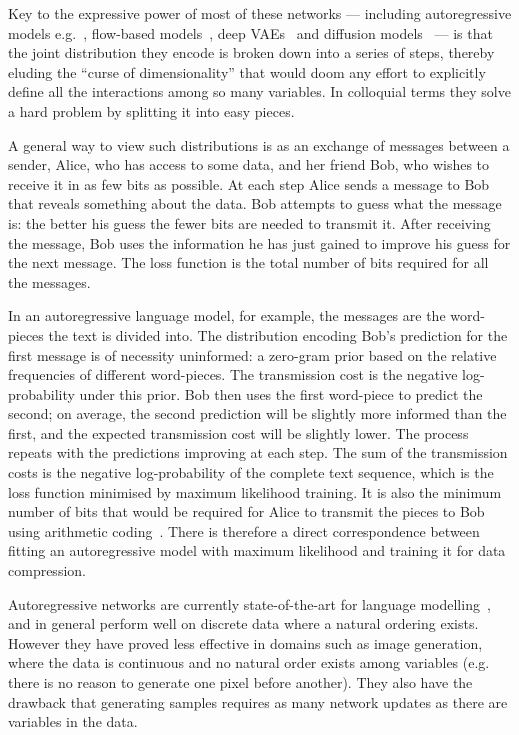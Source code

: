 \documentclass[11pt,table]{article}
\newcommand{\0}[1]{\constvec{0}{#1}}
\newcommand{\1}[1]{\constvec{1}{#1}}
\begin{document}
Key to the expressive power of most of these networks --- including autoregressive models e.g.~\citep{sutskever2011generating,graves2013generating}, flow-based models~\citep{rezende2015variational}, deep VAEs~\citep{vahdat2020nvae} and diffusion models~\citep{sohl2015deep} --- is that the joint distribution they encode is broken down into a series of steps, thereby eluding the ``curse of dimensionality'' that would doom any effort to explicitly define all the interactions among so many variables.
In colloquial terms they solve a hard problem by splitting it into easy pieces.

A general way to view such distributions is as an exchange of messages between a sender, Alice, who has access to some data, and her friend Bob, who wishes to receive it in as few bits as possible. 
At each step Alice sends a message to Bob that reveals something about the data.
Bob attempts to guess what the message is: the better his guess the fewer bits are needed to transmit it.
After receiving the message, Bob uses the information he has just gained to improve his guess for the next message.
The loss function is the total number of bits required for all the messages.

In an autoregressive language model, for example, the messages are the word-pieces the text is divided into. 
The distribution encoding Bob’s prediction for the first message is of necessity uninformed: a zero-gram prior based on the relative frequencies of different word-pieces. 
The transmission cost is the negative log-probability under this prior. 
Bob then uses the first word-piece to predict the second; on average, the second prediction will be slightly more informed than the first, and the expected transmission cost will be slightly lower. 
The process repeats with the predictions improving at each step. 
The sum of the transmission costs is the negative log-probability of the complete text sequence, which is the loss function minimised by maximum likelihood training.  
It is also the minimum number of bits that would be required for Alice to transmit the pieces to Bob using arithmetic coding~\citep{witten1987arithmetic}. 
There is therefore a direct correspondence between fitting an autoregressive model with maximum likelihood and training it for data compression.

Autoregressive networks are currently state-of-the-art for language modelling~\citep{openai2023gpt4}, and in general perform well on discrete data where a natural ordering exists.
However they have proved less effective in domains such as image generation, where the data is continuous and no natural order exists among variables (e.g. there is no reason to generate one pixel before another).
They also have the drawback that generating samples requires as many network updates as there are variables in the data.
\end{document}
